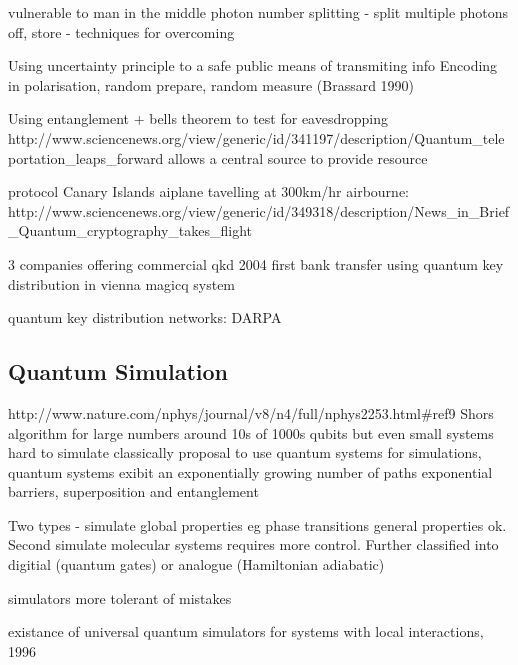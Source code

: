 vulnerable to man in the middle
photon number splitting \cite{qkd_number_splitting_attacks_00} - split multiple photons off, store - techniques for overcoming \cite{qkd_decoy_defense}

Using uncertainty principle to a safe public means of transmiting info
Encoding in polarisation, random prepare, random measure (Brassard 1990)

Using entanglement + bells theorem \cite{bells_theorem} to test for eavesdropping
http://www.sciencenews.org/view/generic/id/341197/description/Quantum_teleportation_leaps_forward
\cite{ekert_91} allows a central source to provide resource
\cite{quantum_crypt_review}

\cite{quantum_repeaters} protocol
\cite{entanglement_97km_08}
\cite{entanglement_144km_07} Canary Islands
\cite{qkd_noisy_channel_12}
\cite{qkd_airbourne_13} aiplane tavelling at 300km/hr
airbourne: http://www.sciencenews.org/view/generic/id/349318/description/News_in_Brief_Quantum_cryptography_takes_flight

3 companies offering commercial qkd
2004 first bank transfer using quantum key distribution in vienna \cite{qkd_bank_transfer_04}
\cite{idquant_qkd_system} \cite{magiq_qkd_system}
\cite{qkd_blinding_attack}
magicq system

quantum key distribution networks: DARPA
\cite{secoqc_network}
\cite{tokyo_qkd_network}


\subsection{Quantum Simulation}
http://www.nature.com/nphys/journal/v8/n4/full/nphys2253.html#ref9
\cite{simulation_ion_review} Shors algorithm for large numbers around 10s of 1000s qubits
but even small systems hard to simulate classically
\cite{feynman_82} proposal to use quantum systems for simulations, quantum systems exibit an exponentially growing number of paths
exponential barriers, superposition and entanglement

Two types - simulate global properties \cite{simulation_photon_review} eg phase transitions general properties ok. Second simulate molecular systems requires more control. Further classified into digitial (quantum gates) or analogue (Hamiltonian adiabatic) \cite{science_quantum_simulator_review_09}

simulators more tolerant of mistakes

\cite{lloyd_universal_simulators} existance of universal quantum simulators for systems with local interactions, 1996

